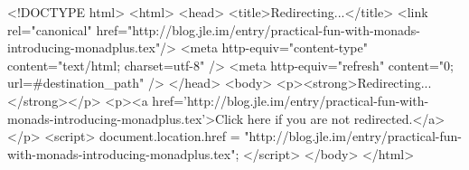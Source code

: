 <!DOCTYPE html>
<html>
<head>
<title>Redirecting...</title>
<link rel="canonical" href="http://blog.jle.im/entry/practical-fun-with-monads-introducing-monadplus.tex"/>
<meta http-equiv="content-type" content="text/html; charset=utf-8" />
<meta http-equiv="refresh" content="0; url=#{destination_path}" />
</head>
<body>
  <p><strong>Redirecting...</strong></p>
  <p><a href='http://blog.jle.im/entry/practical-fun-with-monads-introducing-monadplus.tex'>Click here if you are not redirected.</a></p>
  <script>
    document.location.href = "http://blog.jle.im/entry/practical-fun-with-monads-introducing-monadplus.tex";
  </script>
</body>
</html>
